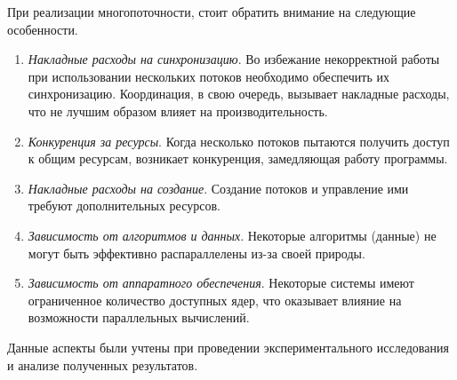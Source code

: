 При реализации многопоточности, стоит обратить внимание на следующие особенности.
\begin{enumerate}
    \item \textit{Накладные расходы на синхронизацию}. Во избежание некорректной работы при использовании нескольких потоков необходимо обеспечить их синхронизацию. Координация, в свою очередь, вызывает накладные расходы, что не лучшим образом влияет на производительность.
    \item \textit{Конкуренция за ресурсы}. Когда несколько потоков пытаются получить доступ к общим ресурсам, возникает конкуренция, замедляющая работу программы.
    \item \textit{Накладные расходы на создание}. Создание потоков и управление ими требуют дополнительных ресурсов.
    \item \textit{Зависимость от алгоритмов и данных}. Некоторые алгоритмы (данные) не могут быть эффективно распараллелены из-за своей природы.
    \item \textit{Зависимость от аппаратного обеспечения}. Некоторые системы имеют ограниченное количество доступных ядер, что оказывает влияние на возможности параллельных вычислений.
\end{enumerate}

Данные аспекты были учтены при проведении экспериментального исследования и анализе полученных результатов.